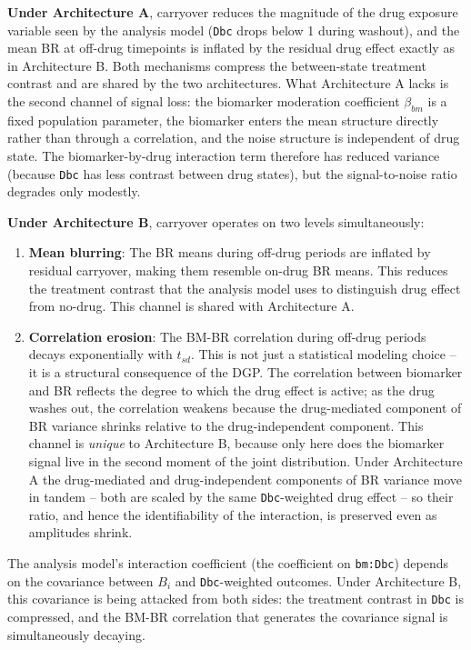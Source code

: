 \documentclass[11pt]{article}
\begin{document}
\textbf{Under Architecture A}, carryover reduces the magnitude
of the drug exposure variable seen by the analysis model
(\texttt{Dbc} drops below 1 during washout), and the mean BR at
off-drug timepoints is inflated by the residual drug effect
exactly as in Architecture B. Both mechanisms compress the
between-state treatment contrast and are shared by the two
architectures. What Architecture A lacks is the second channel
of signal loss: the biomarker moderation coefficient
$\beta_{bm}$ is a fixed population parameter, the biomarker
enters the mean structure directly rather than through a
correlation, and the noise structure is independent of drug
state. The biomarker-by-drug interaction term therefore has
reduced variance (because \texttt{Dbc} has less contrast between
drug states), but the signal-to-noise ratio degrades only
modestly.

\textbf{Under Architecture B}, carryover operates on two levels
simultaneously:

\begin{enumerate}
\item \textbf{Mean blurring}: The BR means during off-drug periods are
  inflated by residual carryover, making them resemble on-drug
  BR means. This reduces the treatment contrast that the analysis
  model uses to distinguish drug effect from no-drug. This channel
  is shared with Architecture A.

\item \textbf{Correlation erosion}: The BM-BR correlation during off-drug
  periods decays exponentially with $t_{sd}$. This is not just a
  statistical modeling choice -- it is a structural consequence
  of the DGP. The correlation between biomarker and BR reflects
  the degree to which the drug effect is active; as the drug
  washes out, the correlation weakens because the drug-mediated
  component of BR variance shrinks relative to the
  drug-independent component. This channel is \emph{unique} to
  Architecture B, because only here does the biomarker signal
  live in the second moment of the joint distribution. Under
  Architecture A the drug-mediated and drug-independent
  components of BR variance move in tandem -- both are scaled by
  the same \texttt{Dbc}-weighted drug effect -- so their ratio,
  and hence the identifiability of the interaction, is preserved
  even as amplitudes shrink.
\end{enumerate}

The analysis model's interaction coefficient (the coefficient
on \texttt{bm:Dbc}) depends on the covariance between $B_i$ and
\texttt{Dbc}-weighted outcomes. Under Architecture B, this
covariance is being attacked from both sides: the treatment
contrast in \texttt{Dbc} is compressed, and the BM-BR
correlation that generates the covariance signal is
simultaneously decaying.
\end{document}
